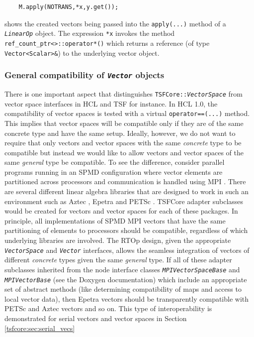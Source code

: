 {\scriptsize\begin{verbatim}
    M.apply(NOTRANS,*x,y.get());
\end{verbatim}}

\noindent shows the created vectors being passed into the \texttt{apply(\-...)}
method of a \texttt{\textit{LinearOp}} object.  The expression
\texttt{*x} invokes the method
\texttt{ref\_count\_ptr<>\-::operator*()} which returns a reference
(of type \texttt{Vector<Scalar>\&}) to the underlying vector object.

%
\subsubsection{General compatibility of \texttt{\textit{Vector}} objects}
\label{tsfcore:sec:vec_spc_compatibility}
%

There is one important aspect that distinguishes
\texttt{TSFCore\-::\textit{VectorSpace}} from vector space interfaces in
HCL and TSF for instance.  In HCL 1.0, the compatibility of vector
spaces is tested with a virtual \texttt{operator==(...)}  method.
This implies that vector spaces will be compatible only if they are of
the same concrete type and have the same setup.  Ideally, however, we
do not want to require that only vectors and vector spaces with the
same {\em concrete} type to be compatible but instead we would like to
allow vectors and vector spaces of the same {\em general} type be
compatible.  To see the difference, consider parallel programs running
in an SPMD configuration where vector elements are partitioned across
processors and communication is handled using MPI
\cite{ref:mpi}.  There are several different linear algebra libraries
that are designed to work in such an environment such as Aztec
\cite{ref:aztec}, Epetra \cite{ref:Epetra} and PETSc \cite{ref:petsc}.  TSFCore
adapter subclasses would be created for vectors and vector spaces for
each of these packages.  In principle, all implementations of SPMD MPI
vectors that have the same partitioning of elements to processors
should be compatible, regardless of which underlying libraries
are involved.  The RTOp design, given the appropriate
\texttt{\textit{VectorSpace}} and \texttt{\textit{Vector}} interfaces,
allows the seamless integration of vectors of different {\em concrete}
types given the same {\em general} type.  If all of these adapter
subclasses inherited from the node interface classes
\texttt{\textit{MPIVectorSpaceBase}} and
\texttt{\textit{MPIVectorBase}} (see the Doxygen documentation) which
include an appropriate set of abstract methods (like determining
compatibility of maps and access to local vector data), then Epetra
vectors should be transparently compatible with PETSc and Aztec
vectors and so on.  This type of interoperability is demonstrated for
serial vectors and vector spaces in Section
\ref{tsfcore:sec:serial_vecs}

